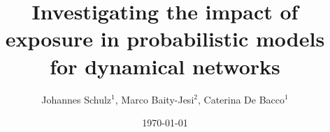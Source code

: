 \documentclass[12pt]{iopart}%
\begin{document}
\title{Investigating the impact of exposure in probabilistic models for dynamical networks}

\author{Johannes Schulz$^1$, Marco Baity-Jesi$^2$, Caterina De Bacco$^1$}


\address{$^1$ Max Planck Institute for Intelligent Systems, Cyber Valley, Tuebingen, 72076, Germany}
\address{$^2$ Eawag, \"Uberlandstrasse 133, CH-8600 D\"ubendorf, Switzerland}
\vspace{10pt}

\date{\today}

%

%
%
%
\maketitle
% 

%
%










\end{document}
